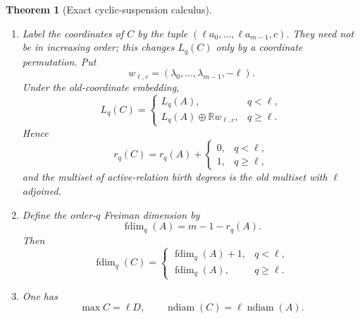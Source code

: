 \documentclass[11pt,reqno]{amsart}
\newtheorem{theorem}{Theorem}[section]
\theoremstyle{definition}
\theoremstyle{remark}
\newcommand{\ndiam}{\operatorname{ndiam}}
\begin{document}
\begin{theorem}[Exact cyclic-suspension calculus]
\begin{enumerate}[label=\textup{(\roman*)}]
\item Label the coordinates of $C$ by the tuple
$(\ell a_0,\ldots,\ell a_{m-1},c)$.  They need not be in increasing order;
this changes $L_q(C)$ only by a coordinate permutation.  Put
\[
 w_{\ell,c}=(\lambda_0,\ldots,\lambda_{m-1},-\ell).
\]
Under the old-coordinate embedding,
\begin{equation}\label{eq:suspension-filter}
 L_q(C)=
 \begin{cases}
  L_q(A),&q<\ell,\\[2mm]
  L_q(A)\oplus\mathbb Rw_{\ell,c},&q\geq\ell.
 \end{cases}
\end{equation}
Hence
\begin{equation}\label{eq:suspension-rank}
 r_q(C)=r_q(A)+
 \begin{cases}
  0,&q<\ell,\\
  1,&q\geq\ell,
 \end{cases}
\end{equation}
and the multiset of active-relation birth degrees is the old multiset with
$\ell$ adjoined.

\item Define the order-$q$ Freiman dimension by
\[
 \operatorname{fdim}_q(A)=m-1-r_q(A).
\]
Then
\begin{equation}\label{eq:suspension-Freiman-dimension}
 \operatorname{fdim}_q(C)=
 \begin{cases}
  \operatorname{fdim}_q(A)+1,&q<\ell,\\
  \operatorname{fdim}_q(A),&q\geq\ell.
 \end{cases}
\end{equation}

\item One has
\begin{equation}\label{eq:suspension-diameter}
 \max C=\ell D,\qquad
 \ndiam(C)=\ell\ndiam(A).
\end{equation}
\end{enumerate}
\end{theorem}
\end{document}
